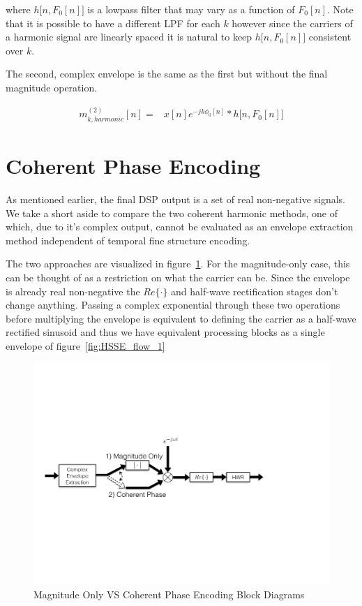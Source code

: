 \documentclass [11pt, proquest,oneside] {ganter_thesis}[2015/03/03]
\begin{document}
where $h\big[n, F_0[n] \big]$ is a lowpass filter that may vary as a function of $F_0[n]$.  Note that it is possible to have a different LPF for each $k$ however since the carriers of a harmonic signal are linearly spaced it is natural to keep $h\big[n, F_0[n] \big]$ consistent over $k$.

The second, complex envelope is the same as the first but without the final magnitude operation.

\begin{align}
m^{(2)}_{k,harmonic}[n] =& x[n] e^{-jk\phi_0 [n]} * h\big[n, F_0[n] \big]
\end{align}

\section{Coherent Phase Encoding}

As mentioned earlier, the final DSP output is a set of real non-negative signals.  We take a short aside to compare the two coherent harmonic methods, one of which, due to it's complex output, cannot be evaluated as an envelope extraction method independent of temporal fine structure encoding.

The two approaches are visualized in figure~\ref{fig:coherent_angle}.  For the magnitude-only case, this can be thought of as a restriction on what the carrier can be.  Since the envelope is already real non-negative the $Re\{\cdot\}$ and half-wave rectification stages don't change anything.  Passing a complex exponential through these two operations before multiplying the envelope is equivalent to defining the carrier as a half-wave rectified sinusoid and thus we have equivalent processing blocks as a single envelope of figure~\ref{fig:HSSE_flow_1}

\begin{figure}[!ht]
  \centering
    \includegraphics[width=1\textwidth]{coherent_phase}   
    \caption{Magnitude Only VS Coherent Phase Encoding Block Diagrams}
    \label{fig:coherent_angle}
\end{figure}
\end{document}
